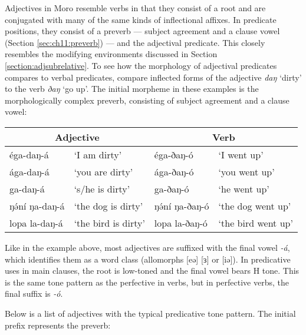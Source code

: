 Adjectives in Moro resemble verbs in that they consist of a root and are conjugated with many of the same kinds of inflectional affixes. In predicate positions, they consist of a preverb --- subject agreement and a clause vowel (Section \ref{sec:ch11:preverb}) --- and the adjectival predicate. This closely resembles the modifying environments discussed in Section \ref{section:adjsubrelative}. To see how the morphology of adjectival predicates compares to verbal predicates, compare inflected forms of the adjective \textit{daŋ} ‘dirty’ to the verb \textit{ðaŋ} ‘go up’. The initial morpheme in these examples is the morphologically complex preverb, consisting of subject agreement and a clause vowel:

\ea 
\begin{tabular}[t]{llll}
	\multicolumn{2}{c}{Adjective} 	& 	\multicolumn{2}{c}{Verb} \\
	\midrule
	éga-daŋ-á	& ‘I am dirty’ & 	éga-ðaŋ-ó	& ‘I went up’\\
	ága-daŋ-á	& ‘you are dirty’	& ága-ðaŋ-ó	& ‘you went up’\\
	ga-daŋ-á	& ‘s/he is dirty’	& ga-ðaŋ-ó	& ‘he went up’	\\
	ŋə́ní ŋa-daŋ-á	 & ‘the dog is dirty’	& ŋə́ní ŋa-ðaŋ-ó	& ‘the dog went up’\\
	lopa la-daŋ-á	& ‘the bird is dirty’	& lopa la-ðaŋ-ó	& ‘the bird went up’\\
\end{tabular}
\z 

Like in the example above, most adjectives are suffixed with the final vowel \textit{-á}, which identifies them as a word class (allomorphs [eə] [ɜ] or [iə]). In predicative uses in main clauses, the root is low-toned and the final vowel bears H tone. This is the same tone pattern as the perfective in verbs, but in perfective verbs, the final suffix is \textit{-ó}.  

Below is a list of adjectives with the typical predicative tone pattern. The initial prefix represents the preverb:

